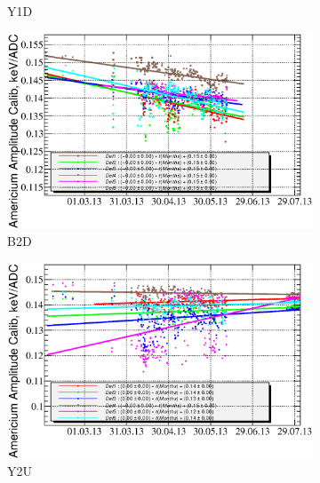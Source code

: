\documentclass[a4paper,12pt]{article}
\begin{document}
\begin{figure}[p]
\begin{subfigure}[t]{0.49\textwidth}
\caption{Y1D}
\end{subfigure}
%
\begin{subfigure}[t]{0.49\textwidth}
\includegraphics[width=\textwidth]{gfx/run13_alpha_study/B2D/c_chAmGain_by_day_B2D.eps}
\caption{B2D}
\end{subfigure}
%
\hfill
%
\begin{subfigure}[t]{0.49\textwidth}
\includegraphics[width=\textwidth]{gfx/run13_alpha_study/Y2U/c_chAmGain_by_day_Y2U.eps}
\caption{Y2U}
\end{subfigure}
%
\caption{\amgainlabel}
\label{fig:gainAm}
\end{figure}
\end{document}
